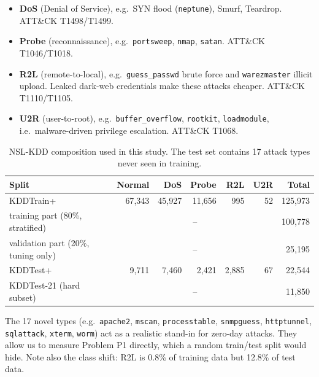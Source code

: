 \documentclass[12pt,a4paper,oneside]{article}
\begin{document}
\begin{itemize}
  \item \textbf{DoS} (Denial of Service), e.g.\ SYN flood (\texttt{neptune}), Smurf, Teardrop. ATT\&CK T1498/T1499.
  \item \textbf{Probe} (reconnaissance), e.g.\ \texttt{portsweep}, \texttt{nmap}, \texttt{satan}. ATT\&CK T1046/T1018.
  \item \textbf{R2L} (remote-to-local), e.g.\ \texttt{guess\_passwd} brute force and \texttt{warezmaster} illicit upload. Leaked dark-web credentials make these attacks cheaper. ATT\&CK T1110/T1105.
  \item \textbf{U2R} (user-to-root), e.g.\ \texttt{buffer\_overflow}, \texttt{rootkit}, \texttt{loadmodule}, i.e.\ malware-driven privilege escalation. ATT\&CK T1068.
\end{itemize}

\begin{table}[H]\centering\small
\caption{NSL-KDD composition used in this study. The test set contains 17 attack types never seen in training.}\label{tab:data}
\begin{tabular}{lrrrrrr}
\toprule
\textcolor{rblue}{Split} & \textcolor{rblue}{Normal} & \textcolor{rblue}{DoS} & \textcolor{rblue}{Probe} & \textcolor{rblue}{R2L} & \textcolor{rblue}{U2R} & \textcolor{rblue}{Total} \\ \midrule
KDDTrain+ & 67{,}343 & 45{,}927 & 11{,}656 & 995 & 52 & 125{,}973 \\
\quad training part (80\%, stratified) & \multicolumn{5}{c}{--} & 100{,}778 \\
\quad validation part (20\%, tuning only) & \multicolumn{5}{c}{--} & 25{,}195 \\
KDDTest+ & 9{,}711 & 7{,}460 & 2{,}421 & 2{,}885 & 67 & 22{,}544 \\
KDDTest-21 (hard subset) & \multicolumn{5}{c}{--} & 11{,}850 \\
\bottomrule
\end{tabular}

\end{table}

The 17 novel types (e.g.\ \texttt{apache2}, \texttt{mscan}, \texttt{processtable}, \texttt{snmpguess}, \texttt{httptunnel}, \texttt{sqlattack}, \texttt{xterm}, \texttt{worm}) act as a realistic stand-in for zero-day attacks. They allow us to measure Problem P1 directly, which a random train/test split would hide. Note also the class shift: R2L is 0.8\% of training data but 12.8\% of test data.
\end{document}
